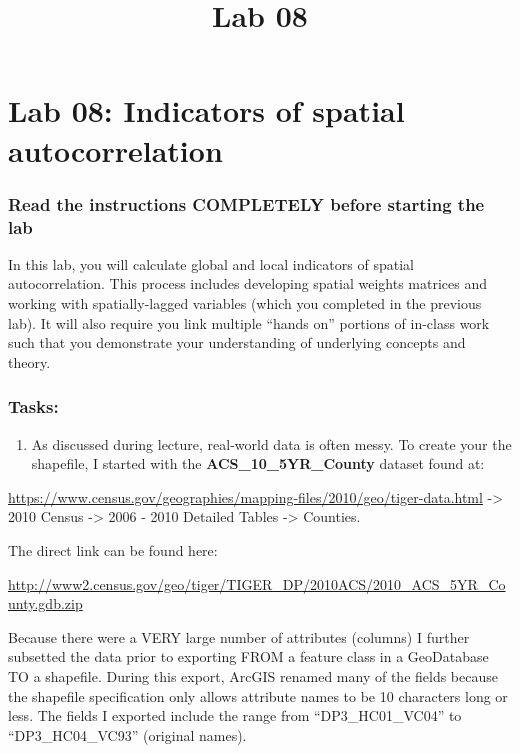 \documentclass[]{article}
\title{Lab 08}
\author{}
\date{}
\makeatletter
\providecommand{\tightlist}{%
  \setlength{\itemsep}{0pt}\setlength{\parskip}{0pt}}
\renewcommand{\maketitle}{\bgroup\vspace*{-1cm}\setlength{\parindent}{0pt}
\begin{flushleft}
  \@author
  
  \@date
  
\end{flushleft}\egroup
}
\makeatother
\begin{document}
\maketitle

\hypertarget{lab-08-indicators-of-spatial-autocorrelation}{%
\section{Lab 08: Indicators of spatial
autocorrelation}\label{lab-08-indicators-of-spatial-autocorrelation}}

\hypertarget{read-the-instructions-completely-before-starting-the-lab}{%
\subsubsection{Read the instructions COMPLETELY before starting the
lab}\label{read-the-instructions-completely-before-starting-the-lab}}

In this lab, you will calculate global and local indicators of spatial
autocorrelation. This process includes developing spatial weights
matrices and working with spatially-lagged variables (which you
completed in the previous lab). It will also require you link multiple
``hands on'' portions of in-class work such that you demonstrate your
understanding of underlying concepts and theory.

\hypertarget{tasks}{%
\subsubsection{Tasks:}\label{tasks}}

\begin{enumerate}
\def\labelenumi{\arabic{enumi}.}
\tightlist
\item
  As discussed during lecture, real-world data is often messy. To create
  your the shapefile, I started with the \textbf{ACS\_10\_5YR\_County}
  dataset found at:
\end{enumerate}

\url{https://www.census.gov/geographies/mapping-files/2010/geo/tiger-data.html}
-\textgreater{} 2010 Census -\textgreater{} 2006 - 2010 Detailed Tables
-\textgreater{} Counties.

The direct link can be found here:

\url{http://www2.census.gov/geo/tiger/TIGER_DP/2010ACS/2010_ACS_5YR_County.gdb.zip}

Because there were a VERY large number of attributes (columns) I further
subsetted the data prior to exporting FROM a feature class in a
GeoDatabase TO a shapefile. During this export, ArcGIS renamed many of
the fields because the shapefile specification only allows attribute
names to be 10 characters long or less. The fields I exported include
the range from ``DP3\_HC01\_VC04'' to ``DP3\_HC04\_VC93'' (original
names).
\end{document}
